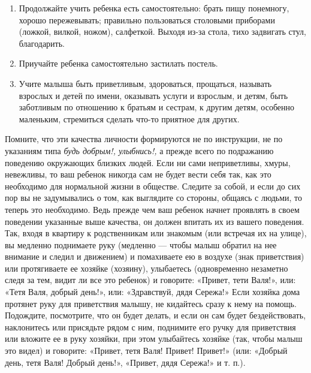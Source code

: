 \documentclass{book}
\renewcommand{\emph}[1]{\textit{#1}}
\begin{document}
\begin{enumerate}
\def\labelenumi{\arabic{enumi}.}
\setcounter{enumi}{2}
\item
  
  Продолжайте учить ребенка есть самостоятельно: брать пищу понемногу,
  хорошо пережевывать; правильно пользоваться столовыми приборами
  (ложкой, вилкой, ножом), салфеткой. Выходя из-за стола, тихо задвигать
  стул, благодарить.
  
\item
  
  Приучайте ребенка самостоятельно застилать постель.
  
\item
  
  Учите малыша быть приветливым, здороваться, прощаться, называть
  взрослых и детей по имени, оказывать услуги и взрослым, и детям, быть
  заботливым по отношению к братьям и сестрам, к другим детям, особенно
  маленьким, стремиться сделать что-то приятное для других.
  
\end{enumerate}


Помните, что эти качества личности формируются не по инструкции, не по
указаниям типа \emph{будь добрым!, улыбнись!,} а прежде всего по
подражанию поведению окружающих близких людей. Если ни сами
неприветливы, хмуры, невежливы, то ваш ребенок никогда сам не будет
вести себя так, как это необходимо для нормальной жизни в обществе.
Следите за собой, и если до сих пор вы не задумывались о том, как
выглядите со стороны, общаясь с людьми, то теперь это необходимо. Ведь
прежде чем ваш ребенок начнет проявлять в своем поведении указанные выше
качества, он должен впитать их из вашего поведения. Так, входя в
квартиру к родственникам или знакомым (или встречая их на улице), вы
медленно поднимаете руку (медленно --- чтобы малыш обратил на нее
внимание и следил и движением) и помахиваете ею в воздухе (знак
приветствия) или протягиваете ее хозяйке (хозяину), улыбаетесь
(одновременно незаметно следя за тем, видит ли все это ребенок) и
говорите: «Привет, тети Валя!», или: «Тетя Валя, добрый день!», или:
«Здравствуй, дядя Сережа!» Если хозяйка дома протянет руку для
приветствия малышу, не кидайтесь сразу к нему на помощь. Подождите,
посмотрите, что он будет делать, и если он сам будет бездействовать,
наклонитесь или присядьте рядом с ним, поднимите его ручку для
приветствия или вложите ее в руку хозяйки, при этом улыбайтесь хозяйке
(так, чтобы малыш это видел) и говорите: «Привет, тетя Валя! Привет!
Привет!» (или: «Добрый день, тетя Валя! Добрый день!», «Привет, дядя
Сережа!» и т. п.).
\end{document}
